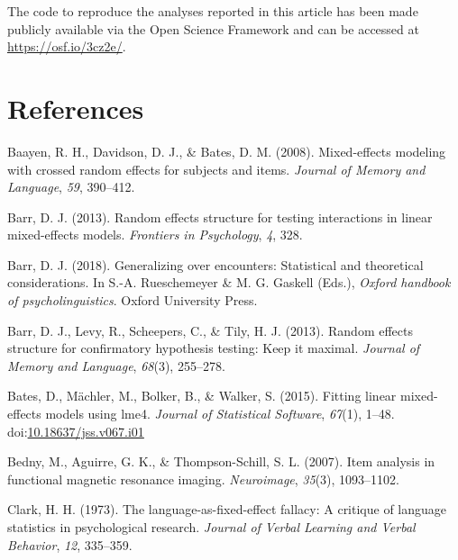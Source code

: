 \documentclass[man,floatsintext]{apa6}
\begin{document}
The code to reproduce the analyses reported in this article has been made publicly available via the Open Science Framework and can be accessed at \url{https://osf.io/3cz2e/}.

\newpage

\hypertarget{references}{%
\section{References}\label{references}}

\begingroup
\setlength{\parindent}{-0.5in}
\setlength{\leftskip}{0.5in}

\hypertarget{refs}{}
\leavevmode\hypertarget{ref-baayen_davidson_bates_2008}{}%
Baayen, R. H., Davidson, D. J., \& Bates, D. M. (2008). Mixed-effects modeling with crossed random effects for subjects and items. \emph{Journal of Memory and Language}, \emph{59}, 390--412.

\leavevmode\hypertarget{ref-barr_2013}{}%
Barr, D. J. (2013). Random effects structure for testing interactions in linear mixed-effects models. \emph{Frontiers in Psychology}, \emph{4}, 328.

\leavevmode\hypertarget{ref-barr_2018}{}%
Barr, D. J. (2018). Generalizing over encounters: Statistical and theoretical considerations. In S.-A. Rueschemeyer \& M. G. Gaskell (Eds.), \emph{Oxford handbook of psycholinguistics}. Oxford University Press.

\leavevmode\hypertarget{ref-barr_et_al_2013}{}%
Barr, D. J., Levy, R., Scheepers, C., \& Tily, H. J. (2013). Random effects structure for confirmatory hypothesis testing: Keep it maximal. \emph{Journal of Memory and Language}, \emph{68}(3), 255--278.

\leavevmode\hypertarget{ref-R-lme4}{}%
Bates, D., Mächler, M., Bolker, B., \& Walker, S. (2015). Fitting linear mixed-effects models using lme4. \emph{Journal of Statistical Software}, \emph{67}(1), 1--48. doi:\href{https://doi.org/10.18637/jss.v067.i01}{10.18637/jss.v067.i01}

\leavevmode\hypertarget{ref-bedny_aguirre_thompson-schill_2007}{}%
Bedny, M., Aguirre, G. K., \& Thompson-Schill, S. L. (2007). Item analysis in functional magnetic resonance imaging. \emph{Neuroimage}, \emph{35}(3), 1093--1102.

\leavevmode\hypertarget{ref-clark_1973}{}%
Clark, H. H. (1973). The language-as-fixed-effect fallacy: A critique of language statistics in psychological research. \emph{Journal of Verbal Learning and Verbal Behavior}, \emph{12}, 335--359.
\end{document}
